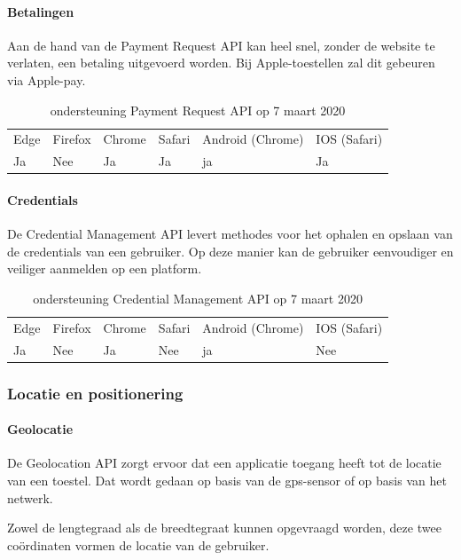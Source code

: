 \paragraph{Betalingen}
Aan de hand van de Payment Request API \autocite{Denicola2019} kan heel snel, zonder de website te verlaten, een betaling uitgevoerd worden. Bij Apple-toestellen zal dit gebeuren via Apple-pay. 

\begin{table}[H]
	\centering
	\begin{tabular}{llllll}
		Edge & Firefox & Chrome & Safari & Android (Chrome) & IOS (Safari) \\
		Ja   & Nee      &  Ja     & Ja     & ja               & Ja          
	\end{tabular}	
	\caption{ondersteuning Payment Request API op 7 maart 2020}
\end{table}


\paragraph{Credentials}
De Credential Management API \autocite{West2019} levert methodes voor het ophalen en opslaan van de credentials van een gebruiker. Op deze manier kan de gebruiker eenvoudiger en veiliger aanmelden op een platform.

\begin{table}[H]
	\begin{tabular}{llllll}
		Edge & Firefox & Chrome & Safari & Android (Chrome) & IOS (Safari) \\
		Ja   & Nee      &  Ja     & Nee     & ja               & Nee          
	\end{tabular}	
	\caption{ondersteuning Credential Management API op 7 maart 2020}
\end{table}

\subsubsection{Locatie en positionering}

\paragraph{Geolocatie}
De Geolocation API \autocite{Popescu2018} zorgt ervoor dat een applicatie toegang heeft tot de locatie van een toestel. Dat wordt gedaan op basis van de gps-sensor of op basis van het netwerk. 

Zowel de lengtegraad als de breedtegraat kunnen opgevraagd worden, deze twee coördinaten vormen de locatie van de gebruiker.


